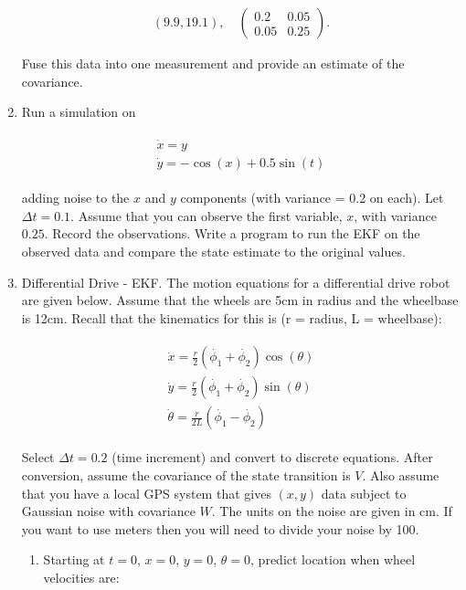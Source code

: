 \begin{enumerate}
  \[\begin{aligned}
  (9.9, 19.1), \quad \left(\begin{array}{cc} 0.2 & 0.05 \\ 0.05 & 0.25
  \end{array}\right).
  \end{aligned}\]

  Fuse this data into one measurement and provide an estimate of the
  covariance.
\item
  Run a simulation on

  \[\begin{aligned}
  \begin{array}{l}\dot{x} = y \\\dot{y} = -\cos(x) + 0.5\sin(t)\end{array}
  \end{aligned}\]

  adding noise to the \(x\) and \(y\) components (with variance = 0.2 on
  each). Let \(\Delta t = 0.1\). Assume that you can observe the first
  variable, \(x\), with variance \(0.25\). Record the observations.
  Write a program to run the EKF on the observed data and compare the
  state estimate to the original values.
\item
  Differential Drive - EKF. The motion equations for a differential
  drive robot are given below. Assume that the wheels are 5cm in radius
  and the wheelbase is 12cm. Recall that the kinematics for this is (r =
  radius, L = wheelbase):

  \[\begin{aligned}
  \begin{array}{l}
   \dot{x} = \frac{r}{2} (\dot{\phi_1}+\dot{\phi_2})\cos(\theta) \\[5mm]
  \dot{y} = \frac{r}{2} (\dot{\phi_1}+\dot{\phi_2})\sin(\theta) \\[5mm]
  \dot{\theta} = \frac{r}{2L} (\dot{\phi_1}-\dot{\phi_2})
  \end{array}
  \end{aligned}\]

  Select \(\Delta t = 0.2\) (time increment) and convert to discrete
  equations. After conversion, assume the covariance of the state
  transition is \(V\). Also assume that you have a local GPS system that
  gives \((x,y)\) data subject to Gaussian noise with covariance \(W\).
  The units on the noise are given in cm. If you want to use meters then
  you will need to divide your noise by 100.

  \begin{enumerate}
  \def\labelenumii{\alph{enumii}.}
  \item
    Starting at \(t=0\), \(x=0\), \(y=0\), \(\theta=0\), predict
    location when wheel velocities are:


\end{enumerate}
\end{enumerate}
